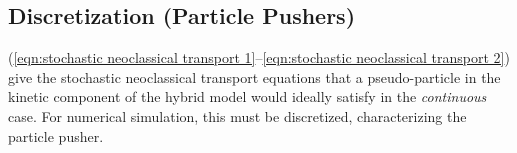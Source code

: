 \subsection{Discretization (Particle Pushers)}
    (\ref{eqn:stochastic neoclassical transport 1}--\ref{eqn:stochastic neoclassical transport 2}) give the stochastic neoclassical transport equations that a pseudo-particle in the kinetic component of the hybrid model would ideally satisfy in the \emph{continuous} case. For numerical simulation, this must be discretized, characterizing the particle pusher.


    
    
    